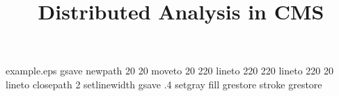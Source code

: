 %
%
%
%
%
\begin{filecontents*}{example.eps}
gsave
newpath
  20 20 moveto
  20 220 lineto
  220 220 lineto
  220 20 lineto
closepath
2 setlinewidth
gsave
  .4 setgray fill
grestore
stroke
grestore
\end{filecontents*}
%
\documentclass{svjour3}                     %
%
\smartqed  %
%
\usepackage{graphicx}
%
%
%
%
%


\title{Distributed Analysis in CMS}


